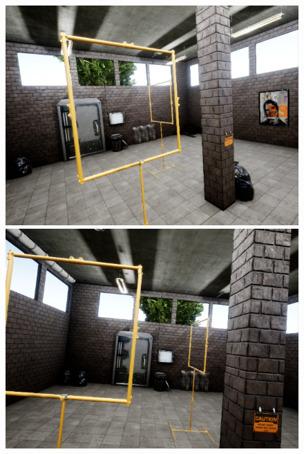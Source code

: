 \documentclass{article}
\begin{document}
\begin{figure}[htbp]
	\begin{minipage}{0.3\linewidth}
	\includegraphics[width=\linewidth]{size_examples/025-05 (1).jpg}
\end{minipage}
\hfill
\begin{minipage}{0.3\linewidth}
	\includegraphics[width=\linewidth]{size_examples/025-05 (9).jpg}
\end{minipage}
\hfill
\begin{minipage}{0.3\linewidth}

\end{minipage}
\end{figure}
\end{document}
